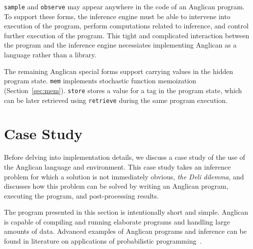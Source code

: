 \documentclass[preprint]{sigplanconf}
\begin{document}

\texttt{sample} and \texttt{observe} may appear anywhere in the
code of an Anglican program. To support these forms, the
inference engine must be able to intervene into execution of the
program, perform computations related to inference, and control
further execution of the program. This tight and complicated
interaction between the program and the inference engine
necessiates implementing Anglican as a language rather than a
library.

The remaining Anglican special forms support carrying values in
the hidden program state. \texttt{mem} implements stochastic
function  memoization (Section~\ref{sec:mem}). \texttt{store}
stores a value for a tag in the program state, which can be
later retrieved using \texttt{retrieve} during the same
program execution.

\section{Case Study}
\label{seq:study}

Before delving into implementation details, we discuss a case study
of the use of the Anglican language and environment. This case study
takes an inference problem for which a solution is not immediately
obvious, \textit{the Deli dilemma}, and discusses how this problem
can be solved by writing an Anglican program, executing the program,
and post-processing results.

The program presented in this section is intentionally short and
simple. Anglican is capable of compiling and running elaborate
programs and handling large amounts of data. Advanced examples of
Anglican programs and inference can be found in literature on
applications of probabilistic programming~\cite{PLW15, P16, MPT+16}.
\end{document}
